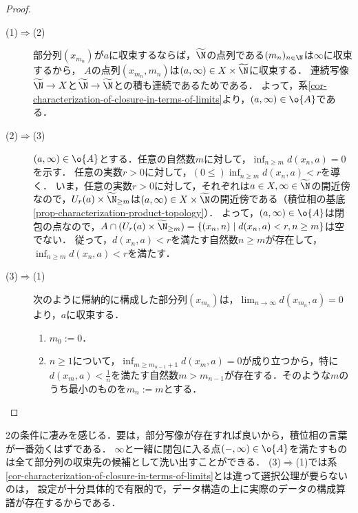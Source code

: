 \documentclass[uplatex,dvipdfmx]{jsreport}
\newcommand{\wN}{\widetilde{\N}}
\begin{document}
\begin{proof}\mbox{}
    \begin{description}
        \item[(1)$\Rightarrow$(2)] 
        部分列$(x_{m_n})$が$a$に収束するならば，$\wN$の点列である$(m_n)_{n\in\N}$は$\infty$に収束するから，
        $A$の点列$(x_{m_n},m_n)$は$(a,\infty)\in X\times\wN$に収束する．
        連続写像$\wN\to X$と$\wN\to\wN$との積も連続であるためである．
        よって，系\ref{cor-characterization-of-closure-in-terms-of-limits}より，$(a,\infty)\in\o{A}$である．
        \item[(2)$\Rightarrow$(3)]
        $(a,\infty)\in\o{A}$とする．任意の自然数$m$に対して，$\inf_{n\ge m}d(x_n,a)=0$を示す．
        任意の実数$r>0$に対して，$(0\le)\inf_{n\ge m}d(x_n,a)<r$を導く．
        いま，任意の実数$r>0$に対して，それぞれは$a\in X,\infty\in\wN$の開近傍なので，$U_r(a)\times\wN_{\ge m}$は$(a,\infty)\in X\times\wN$の開近傍である（積位相の基底\ref{prop-characterization-product-topology}）．
        よって，$(a,\infty)\in\o{A}$は閉包の点なので，$A\cap(U_r(a)\times\wN_{\ge m})=\{(x_n,n)\mid d(x_n,a)<r,n\ge m\}$は空でない．
        従って，$d(x_n,a)<r$を満たす自然数$n\ge m$が存在して，$\inf_{n\ge m}d(x_n,a)<r$を満たす．
        \item[(3)$\Rightarrow$(1)]
        次のように帰納的に構成した部分列$(x_{m_n})$は，$\lim_{n\to\infty}d(x_{m_n},a)=0$より，$a$に収束する．
        \begin{enumerate}
            \item $m_0:=0$．
            \item $n\ge 1$について，$\inf_{m\ge m_{n-1}+1}d(x_m,a)=0$が成り立つから，特に$d(x_m,a)<\frac{1}{n}$を満たす自然数$m>m_{n-1}$が存在する．そのような$m$のうち最小のものを$m_n:=m$とする．
        \end{enumerate}
    \end{description}
\end{proof}
\begin{remarks}
    2の条件に凄みを感じる．要は，部分写像が存在すれば良いから，積位相の言葉が一番効くはずである．
    $\infty$と一緒に閉包に入る点$(-,\infty)\in\o{A}$を満たすものは全て部分列の収束先の候補として洗い出すことができる．
    (3)$\Rightarrow$(1)では系\ref{cor-characterization-of-closure-in-terms-of-limits}とは違って選択公理が要らないのは，
    設定が十分具体的で有限的で，データ構造の上に実際のデータの構成算譜が存在するからである．
\end{remarks}
\end{document}
